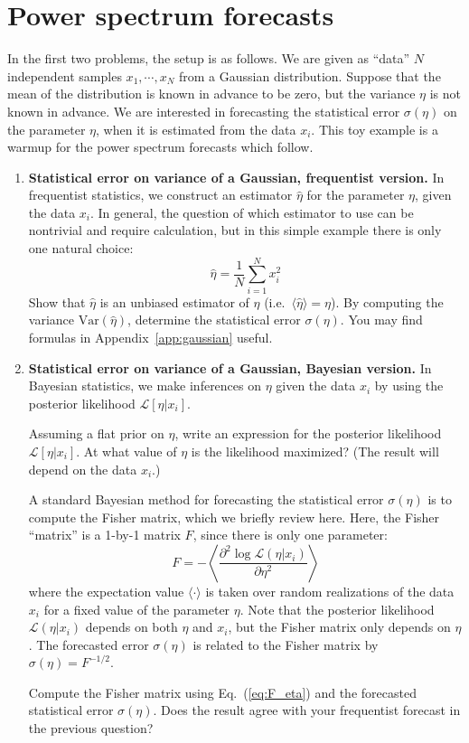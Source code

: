 \documentclass[aps,prd,superscriptaddress,groupedaddress,nofootinbib,nobibnotes]{revtex4}
\newcommand{\be}{\begin{equation}}
\newcommand{\ee}{\end{equation}}
\def\L{{\mathcal L}}
\begin{document}
\section{Power spectrum forecasts}

\par\noindent
In the first two problems, the setup is as follows.
We are given as ``data'' $N$ independent samples $x_1, \cdots, x_N$ from a Gaussian distribution.
Suppose that the mean of the distribution is known in advance to be zero, but the variance $\eta$ is not known in advance.
We are interested in forecasting the statistical error $\sigma(\eta)$ on the parameter $\eta$, when it is estimated from the data $x_i$.
This toy example is a warmup for the power spectrum forecasts which follow.

\begin{enumerate}

\item {\bf Statistical error on variance of a Gaussian, frequentist version.} 
 In frequentist statistics, we construct an estimator $\hat\eta$ for the parameter $\eta$, given the data $x_i$.
 In general, the question of which estimator to use can be nontrivial and require calculation, but in this
 simple example there is only one natural choice:
\be
 \hat\eta = \frac{1}{N} \sum_{i=1}^N x_i^2
\ee
 Show that $\hat\eta$ is an unbiased estimator of $\eta$ (i.e.~$\langle \hat\eta \rangle = \eta$).
 By computing the variance $\mbox{Var}(\hat\eta)$, determine the statistical error $\sigma(\eta)$.
 You may find formulas in Appendix~\ref{app:gaussian} useful.

\item {\bf Statistical error on variance of a Gaussian, Bayesian version.}
 In Bayesian statistics, we make inferences on $\eta$ given the data $x_i$ by
 using the posterior likelihood $\L[\eta|x_i]$.
 
 Assuming a flat prior on $\eta$, write an expression for the posterior likelihood $\L[\eta|x_i]$.
 At what value of $\eta$ is the likelihood maximized?  (The result will depend on the data $x_i$.)

 A standard Bayesian method for forecasting the statistical error $\sigma(\eta)$
 is to compute the Fisher matrix, which we briefly review here.
 Here, the Fisher ``matrix'' is a 1-by-1 matrix $F$, since there is only one parameter:
\be
 F = -\left\langle \frac{\partial^2 \log\L(\eta|x_i)}{\partial \eta^2} \right\rangle  \label{eq:F_eta}
\ee
 where the expectation value $\langle \cdot \rangle$ is taken over random realizations of the data $x_i$
 for a fixed value of the parameter $\eta$.  Note that the posterior likelihood $\L(\eta|x_i)$ depends on
 both $\eta$ and $x_i$, but the Fisher matrix only depends on $\eta$.  The forecasted error $\sigma(\eta)$
 is related to the Fisher matrix by $\sigma(\eta) = F^{-1/2}$.

 Compute the Fisher matrix using Eq.~(\ref{eq:F_eta}) and the forecasted statistical error $\sigma(\eta)$.
 Does the result agree with your frequentist forecast in the previous question?

\setcounter{enumi_save}{\value{enumi}}
\end{enumerate}
\end{document}

